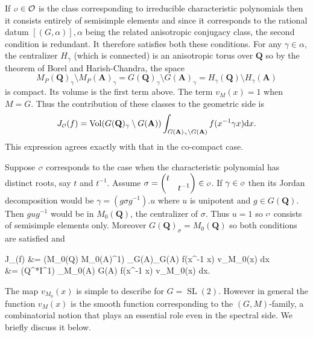 \documentclass[11pt]{amsart}
\def\A{\mathbf A}
\def\I{\mathbf I}
\def\Q{\mathbf Q}
\def\O{\mathcal O}
\def\o{\scalebox{0.8}{$\scriptstyle\mathcal{O}$}}
\def\cb#1{{\color{blue}#1}}
\def\d{\text d}
\def\bs{\setminus} 			%
\def\sl{\operatorname{SL}}
\def\vol{\operatorname{Vol}}
\theoremstyle{remark}
\begin{document}
\cb{
If $\o \in \O$ is the class corresponding to irreducible characteristic polynomials then it consists entirely of semisimple elements and since it corresponds to the rational datum $[(G, \alpha)], \alpha$ being the related anisotropic conjugacy class, the second condition is redundant. It therefore satisfies both these conditions. For any $\gamma \in \alpha$, the centralizer $H_\gamma$ (which is connected) is an anisotropic torus over $\Q$ so by the theorem of Borel and Harish-Chandra, the space
\[ M_P(\Q)_\gamma\bs M_P(\A)_\gamma = G(\Q)_\gamma \bs G(\A)_\gamma = H_\gamma(\Q)\bs H_\gamma(\A) \]
is compact. Its volume is the first term above. The term $v_M(x) = 1$ when $M=G$. Thus the contribution of these classes to the geometric side is
\[ J_{\o}(f) = \vol(G(\Q)_\gamma \bs G(\A)) \int_{G(\A)_\gamma \bs G(\A)} f(x^{-1} \gamma x) \d x. \]
This expression agrees exactly with that in the co-compact case. }

\cb{
Suppose $\o$ corresponds to the case when the characteristic polynomial has distinct roots, say $t$ and $t^{-1}$. Assume $\sigma = \begin{pmatrix} t & \\ & t^{-1} \end{pmatrix} \in \o$. If $\gamma \in \o$ then its Jordan decomposition would be $\gamma = (g\sigma g^{-1}) . u$ where $u$ is unipotent and $g \in G(\Q)$. Then $g u g^{-1}$ would be in $M_0(\Q)$, the centralizer of $\sigma$. Thus $u=1$ so $\o$ consists of semisimple elements only. Moreover $G(\Q)_\sigma = M_0(\Q)$ so both conditions are satisfied and 
\begin{flalign*}
	J_{\o}(f) &=  \vol(M_0(\Q) \bs M_0(\A)^1) \int_{G(\A)_\gamma \bs G(\A)} f(x^{-1} \gamma x) v_{M_0}(x) \d x \\
			&= \vol(\Q^*\bs \I^1) \int_{M_0(\A) \bs G(\A)}  f(x^{-1} \gamma x) v_{M_0}(x) \d x.
\end{flalign*}
}

The map $v_{M_0}(x)$ is simple to describe for $G = \sl(2)$. However in general the function $v_M(x)$ is the smooth function corresponding to the $(G, M)$-family, a combinatorial notion that plays an essential role even in the spectral side. We briefly discuss it below. 
\end{document}
